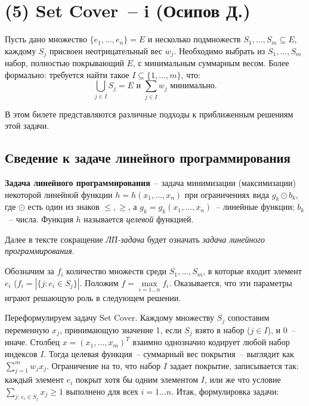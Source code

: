 \hypertarget{setcover}{\section{(5) Set Cover~-- i (Осипов Д.)}}

\begin{problem*}
	Пусть дано множество $\{e_1, \ldots, e_n\} = E$ и несколько подмножеств $S_1, \ldots, S_m \subseteq E$, каждому $S_j$ присвоен неотрицательный вес $w_j$. Необходимо выбрать из $S_1, \ldots, S_m$ набор, полностью покрывающий $E$, с минимальным суммарным весом. Более формально: требуется найти такое $I \subseteq \{1, \ldots, m\}$, что: $$\bigcup_{j\in I} S_j = E \text{ и } \sum_{j \in I} w_j \text{ минимально.}$$
\end{problem*}

В этом билете представляются различные подходы к приближенным решениям этой задачи.

\subsection{Сведение к задаче линейного программирования}

\begin{definition*}
	{\bfseries Задача линейного программирования}~-- задача минимизации (максимизации) некоторой линейной функции $h = h(x_1, \ldots, x_n)$ при ограничениях вида $g_k \odot b_k$, где $\odot$ есть один из знаков $\leq, \geq$, а $g_k = g_k(x_1, \ldots, x_n)$~-- линейные функции; $b_k$~-- числа. Функция $h$ называется \textit{целевой} функцией.
\end{definition*}

Далее в тексте сокращение \textit{ЛП-задача} будет означать \textit{задача линейного программирования}.

Обозначим за $f_i$ количество множеств среди $S_1, \ldots, S_m$, в которые входит элемент $e_i$ ($f_i = \left|\{j: e_i \in S_j\}\right|$. Положим $f = \max\limits_{i=1\ldots n} f_i$. Оказывается, что эти параметры играют решающую роль в следующем решении.

Переформулируем задачу Set Cover. Каждому множеству $S_j$ сопоставим переменную $x_j$, принимающую значение 1, если $S_j$ взято в набор ($j \in I$), и 0~-- иначе. Столбец $x = (x_1, \ldots, x_m)^T$ взаимно однозначно кодирует любой набор индексов $I$. Тогда целевая функция~-- суммарный вес покрытия~-- выглядит как $\sum\limits_{j=1}^m w_j x_j$. Ограничение на то, что набор $I$ задает покрытие, записывается так: каждый элемент $e_i$ покрыт хотя бы одним элементом $I$, или же что условие $\sum\limits_{j:\, e_i \in S_j} x_j \geq 1$ выполнено для всех $i=1\ldots n$. Итак, формулировка задачи:

